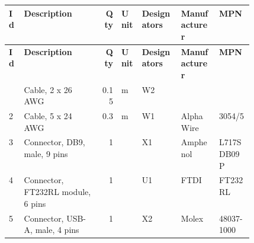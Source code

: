 \begingroup\small\setlength{\tabcolsep}{5pt}
\begin{longtable}{@{}l >{\raggedright\arraybackslash}p{0.32\linewidth} r l >{\raggedright\arraybackslash}p{0.16\linewidth} l l@{}}
\toprule
\textbf{Id} & \textbf{Description} & \textbf{Qty} & \textbf{Unit} & \textbf{Designators} & \textbf{Manufacturer} & \textbf{MPN} \\
\midrule
\endfirsthead
\toprule
\textbf{Id} & \textbf{Description} & \textbf{Qty} & \textbf{Unit} & \textbf{Designators} & \textbf{Manufacturer} & \textbf{MPN} \\
\midrule
\endhead
\bottomrule
\endfoot
1 & Cable, 2 x 26 AWG & 0.15 & m & W2 &  &  \\
2 & Cable, 5 x 24 AWG & 0.3 & m & W1 & Alpha Wire & 3054/5 \\
3 & Connector, DB9, male, 9 pins & 1 &  & X1 & Amphenol & L717SDB09P \\
4 & Connector, FT232RL module, 6 pins & 1 &  & U1 & FTDI & FT232RL \\
5 & Connector, USB-A, male, 4 pins & 1 &  & X2 & Molex & 48037-1000 \\
\end{longtable}\endgroup
